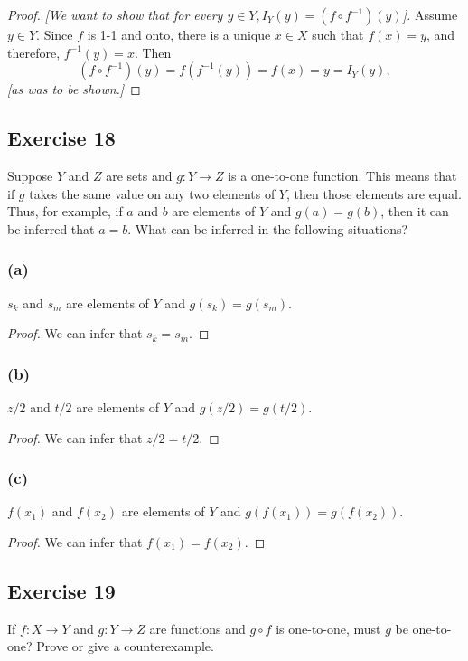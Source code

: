 \documentclass[14pt]{extarticle}
\begin{document}
\begin{proof}
    {\it [We want to show that for every \(y \in Y, I_Y(y) = (f \circ f^{-1})(y)\)].} Assume \(y \in Y\). Since $f$ is 1-1
    and onto, there is a unique \(x \in X\) such that \(f(x) = y\), and therefore, \(f^{-1}(y) = x\). Then
    \[
        (f \circ f^{-1})(y) = f(f^{-1}(y)) = f(x) = y = I_Y(y),
    \]
    {\it [as was to be shown.]}
\end{proof}

\subsection{Exercise 18}
Suppose $Y$ and $Z$ are sets and \(g: Y \to Z\) is a one-to-one function. This means that if $g$ takes the same
value on any two elements of $Y$, then those elements are equal. Thus, for example, if $a$ and $b$ are elements of
$Y$ and \(g(a) = g(b)\), then it can be inferred that $a = b$. What can be inferred in the following situations?

\subsubsection{(a)}
$s_k$ and $s_m$ are elements of $Y$ and \(g(s_k) = g(s_m)\).

\begin{proof}
    We can infer that \(s_k = s_m\).
\end{proof}

\subsubsection{(b)}
$z/2$ and $t/2$ are elements of $Y$ and \(g(z/2) = g(t/2)\).

\begin{proof}
    We can infer that \(z/2 = t/2\).
\end{proof}

\subsubsection{(c)}
$f(x_1)$ and $f(x_2)$ are elements of $Y$ and \(g(f(x_1)) = g(f(x_2))\).

\begin{proof}
    We can infer that \(f(x_1) = f(x_2)\).
\end{proof}

\subsection{Exercise 19}
If \(f: X \to Y\) and \(g: Y \to Z\) are functions and \(g \circ f\) is one-to-one, must $g$ be one-to-one?
Prove or give a counterexample.
\end{document}
